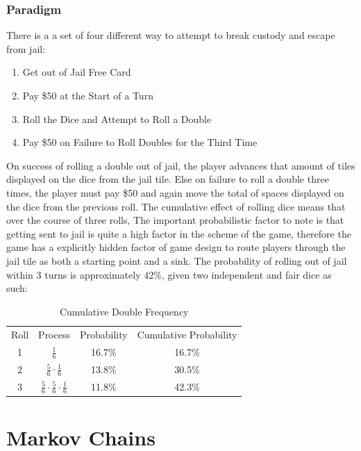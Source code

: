 \documentclass[12pt]{article}
\begin{document}
\subsubsection{Paradigm}
There is a a set of four different way to attempt to break custody and escape from jail:
\begin{enumerate}
  \item {Get out of Jail Free Card}\hfill
  \item {Pay \$50 at the Start of a Turn}\hfill
  \item {Roll the Dice and Attempt to Roll a Double} \hfill
  \item {Pay \$50 on Failure to Roll Doubles for the Third Time} \hfill
\end{enumerate}
On success of rolling a double out of jail, the player advances that amount of tiles displayed on the dice from the jail tile. Else on failure to roll a double three times, the player must pay \$50 and again move the total of spaces displayed on the dice from the previous roll. 
The cumulative effect of rolling dice means that over the course of three rolls, 
The important probabilistic factor to note is that getting sent to jail is quite a high factor in the scheme of the game, therefore the game has a explicitly hidden factor of game design to route players through the jail tile as both a starting point and a sink.
The probability of rolling out of jail within 3 turns is approximately 42\%, given two independent and fair dice as such:
\begin{table}[h]
\centering
\label{Jail Cumulative Probability}
\begin{tabular}{cccc}
Roll & Process              & Probability & Cumulative Probability \\
1    & $\frac{1}{6}$                  & 16.7\%        & 16.7\%                   \\
2    & $\frac{5}{6}\cdot\frac{1}{6}$         & 13.8\%        & 30.5\%                   \\
3    & $\frac{5}{6}\cdot\frac{5}{6}\cdot\frac{1}{6}$ & 11.8\%        & 42.3\%                  
\end{tabular}
\caption{Cumulative Double Frequency}
\end{table}
\section{Markov Chains}
\end{document}
